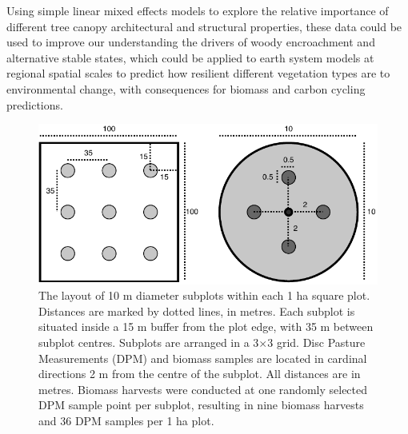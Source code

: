 \begin{refsection}
Using simple linear mixed effects models to explore the relative importance of different tree canopy architectural and structural properties, these data could be used to improve our understanding the drivers of woody encroachment and alternative stable states, which could be applied to earth system models at regional spatial scales to predict how resilient different vegetation types are to environmental change, with consequences for biomass and carbon cycling predictions.

\begin{figure}
	\includegraphics[width=\linewidth]{img/subplot}
	\caption[Grass biomass harvesting subplot layout]{The layout of 10 m diameter subplots within each 1 ha square plot. Distances are marked by dotted lines, in metres. Each subplot is situated inside a 15 m buffer from the plot edge, with 35 m between subplot centres. Subplots are arranged in a 3$\times$3 grid. Disc Pasture Measurements (DPM) and biomass samples are located in cardinal directions 2 m from the centre of the subplot. All distances are in metres. Biomass harvests were conducted at one randomly selected DPM sample point per subplot, resulting in nine biomass harvests and 36 DPM samples per 1 ha plot.}
	\label{legacy:subplot}
\end{figure}

\newpage{}
\FloatBarrier{}
\begingroup
{}
\printbibliography[heading=subbibintoc]
\endgroup

\end{refsection}

